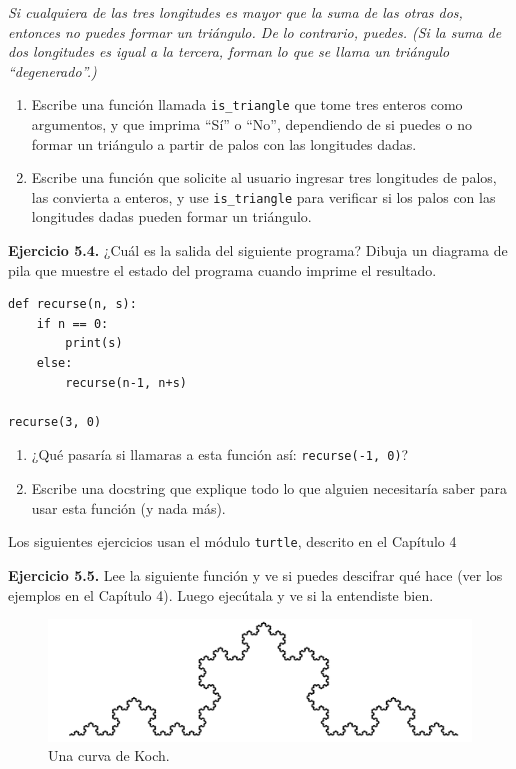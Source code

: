 \emph{Si cualquiera de las tres longitudes es mayor que la suma de las otras dos, entonces no puedes formar un triángulo. De lo contrario, puedes. (Si la suma de dos longitudes es igual a la tercera, forman lo que se llama un triángulo ``degenerado''.)}

\begin{enumerate}
\item Escribe una función llamada \texttt{is\_triangle} que tome tres enteros como argumentos, y que imprima ``Sí'' o ``No'', dependiendo de si puedes o no formar un triángulo a partir de palos con las longitudes dadas.

\item Escribe una función que solicite al usuario ingresar tres longitudes de palos, las convierta a enteros, y use \texttt{is\_triangle} para verificar si los palos con las longitudes dadas pueden formar un triángulo.
\end{enumerate}

\textbf{Ejercicio 5.4.} ¿Cuál es la salida del siguiente programa? Dibuja un diagrama de pila que muestre el estado del programa cuando imprime el resultado.

\begin{lstlisting}
def recurse(n, s):
    if n == 0:
        print(s)
    else:
        recurse(n-1, n+s)

recurse(3, 0)
\end{lstlisting}

\begin{enumerate}
\item ¿Qué pasaría si llamaras a esta función así: \texttt{recurse(-1, 0)}?

\item Escribe una docstring que explique todo lo que alguien necesitaría saber para usar esta función (y nada más).
\end{enumerate}

Los siguientes ejercicios usan el módulo \texttt{turtle}, descrito en el Capítulo 4

\textbf{Ejercicio 5.5.} Lee la siguiente función y ve si puedes descifrar qué hace (ver los ejemplos en el Capítulo 4). Luego ejecútala y ve si la entendiste bien.

\begin{figure}[h]
\centering
\includegraphics[width=0.7\linewidth]{images/chapter_5_2.png} %
\caption{Una curva de Koch.}
\label{fig:koch}
\end{figure}


